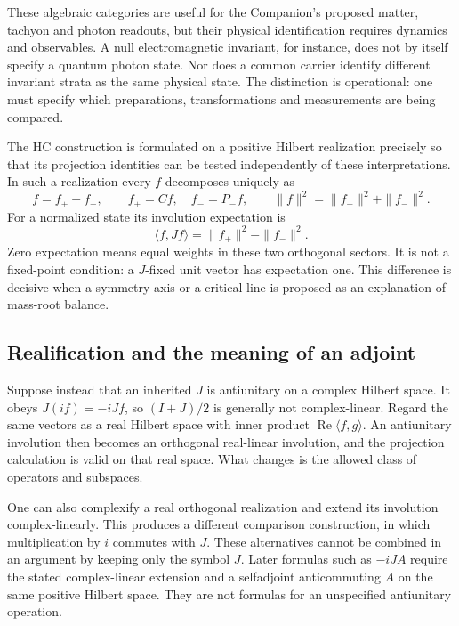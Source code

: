 These algebraic categories are useful for the Companion's proposed
matter, tachyon and photon readouts, but their physical identification
requires dynamics and observables. A null electromagnetic invariant,
for instance, does not by itself specify a quantum photon state.
Nor does a common carrier identify different invariant strata as the
same physical state. The distinction is operational: one must specify
which preparations, transformations and measurements are being compared.

The HC construction is formulated on a positive Hilbert realization
precisely so that its projection identities can be tested independently
of these interpretations. In such a realization every $f$ decomposes
uniquely as
\begin{equation}
 f=f_++f_-,\qquad f_+=Cf,\quad f_-=P_-f,\qquad
 \|f\|^2=\|f_+\|^2+\|f_-\|^2.
\end{equation}
For a normalized state its involution expectation is
\begin{equation}
 \langle f,Jf\rangle=\|f_+\|^2-\|f_-\|^2.
\end{equation}
Zero expectation means equal weights in these two orthogonal sectors.
It is not a fixed-point condition: a $J$-fixed unit vector has expectation
one. This difference is decisive when a symmetry axis or a critical
line is proposed as an explanation of mass-root balance.

\subsection{Realification and the meaning of an adjoint}
Suppose instead that an inherited $J$ is antiunitary on a complex
Hilbert space. It obeys $J(if)=-iJf$, so $(I+J)/2$ is generally not
complex-linear. Regard the same vectors as a real Hilbert space with
inner product $\operatorname{Re}\langle f,g\rangle$. An antiunitary
involution then becomes an orthogonal real-linear involution, and the
projection calculation is valid on that real space. What changes is
the allowed class of operators and subspaces.

One can also complexify a real orthogonal realization and extend its
involution complex-linearly. This produces a different comparison
construction, in which multiplication by $i$ commutes with $J$.
These alternatives cannot be combined in an argument by keeping only
the symbol $J$. Later formulas such as $-iJA$ require the stated
complex-linear extension and a selfadjoint anticommuting $A$ on the
same positive Hilbert space. They are not formulas for an unspecified
antiunitary operation.


